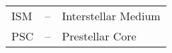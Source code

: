 
\begin{tabular}{ l c l }


ISM & -- & Interstellar Medium\\
PSC & -- & Prestellar Core\\

\end{tabular}

